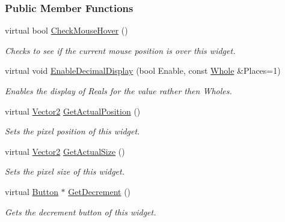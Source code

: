 \subsubsection*{Public Member Functions}
\begin{DoxyCompactItemize}
\item 
virtual bool \hyperlink{classphys_1_1UI_1_1Spinner_ae594a38213702563841f5817609c492e}{CheckMouseHover} ()
\begin{DoxyCompactList}\small\item\em Checks to see if the current mouse position is over this widget. \item\end{DoxyCompactList}\item 
virtual void \hyperlink{classphys_1_1UI_1_1Spinner_a66719b7ef5896598a12942b6dc148b21}{EnableDecimalDisplay} (bool Enable, const \hyperlink{namespacephys_a460f6bc24c8dd347b05e0366ae34f34a}{Whole} \&Places=1)
\begin{DoxyCompactList}\small\item\em Enables the display of Reals for the value rather then Wholes. \item\end{DoxyCompactList}\item 
virtual \hyperlink{classphys_1_1Vector2}{Vector2} \hyperlink{classphys_1_1UI_1_1Spinner_a7ee24e3f5c11550950696a2c9094d716}{GetActualPosition} ()
\begin{DoxyCompactList}\small\item\em Sets the pixel position of this widget. \item\end{DoxyCompactList}\item 
virtual \hyperlink{classphys_1_1Vector2}{Vector2} \hyperlink{classphys_1_1UI_1_1Spinner_af2843083a652f2d7ca6e929582f501fd}{GetActualSize} ()
\begin{DoxyCompactList}\small\item\em Sets the pixel size of this widget. \item\end{DoxyCompactList}\item 
virtual \hyperlink{classphys_1_1UI_1_1Button}{Button} $\ast$ \hyperlink{classphys_1_1UI_1_1Spinner_af6f05d36565da18b8a57c3f50f8eb73d}{GetDecrement} ()
\begin{DoxyCompactList}\small\item\em Gets the decrement button of this widget. \item\end{DoxyCompactList}\item 

\end{DoxyCompactItemize}

